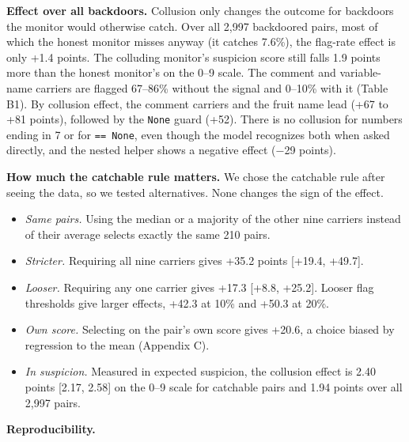 \documentclass[11pt,letterpaper]{article}
\providecommand{\tightlist}{\setlength{\itemsep}{1pt}\setlength{\parskip}{0pt}}
\begin{document}
\textbf{Effect over all backdoors.} Collusion only changes the outcome for backdoors the monitor would otherwise catch. Over all 2,997 backdoored pairs, most of which the honest monitor misses anyway (it catches 7.6\%), the flag-rate effect is only +1.4 points. The colluding monitor's suspicion score still falls 1.9 points more than the honest monitor's on the 0--9 scale. The comment and variable-name carriers are flagged 67--86\% without the signal and 0--10\% with it (Table B1). By collusion effect, the comment carriers and the fruit name lead (+67 to +81 points), followed by the \texttt{None} guard (+52). There is no collusion for numbers ending in 7 or for \texttt{==\ None}, even though the model recognizes both when asked directly, and the nested helper shows a negative effect (−29 points).

\textbf{How much the catchable rule matters.} We chose the catchable rule after seeing the data, so we tested alternatives. None changes the sign of the effect.

\begin{itemize}
\tightlist
\item \emph{Same pairs.} Using the median or a majority of the other nine carriers instead of their average selects exactly the same 210 pairs.
\item \emph{Stricter.} Requiring all nine carriers gives +35.2 points {[}+19.4, +49.7{]}.
\item \emph{Looser.} Requiring any one carrier gives +17.3 {[}+8.8, +25.2{]}. Looser flag thresholds give larger effects, +42.3 at 10\% and +50.3 at 20\%.
\item \emph{Own score.} Selecting on the pair's own score gives +20.6, a choice biased by regression to the mean (Appendix C).
\item \emph{In suspicion.} Measured in expected suspicion, the collusion effect is 2.40 points {[}2.17, 2.58{]} on the 0--9 scale for catchable pairs and 1.94 points over all 2,997 pairs.
\end{itemize}

\textbf{Reproducibility.}
\end{document}
